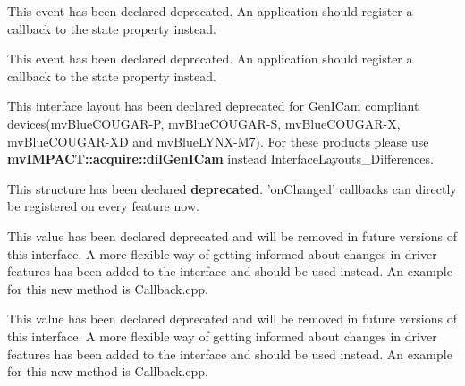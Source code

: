 
\begin{DoxyRefList}
\item[\label{deprecated__deprecated000002}%
\hypertarget{deprecated__deprecated000002}{}%
成员 \hyperlink{group___common_interface_gga0947eb7d6a73b9baab283cbf65cd8d6bae72bb800d1cb1bdc884bb666324a410a}{det\+Pn\+P\+Arrival} ]This event has been declared deprecated. An application should register a callback to the state property instead.  
\item[\label{deprecated__deprecated000003}%
\hypertarget{deprecated__deprecated000003}{}%
成员 \hyperlink{group___common_interface_gga0947eb7d6a73b9baab283cbf65cd8d6bac951ab7abab67fbaa3249ad87084efaf}{det\+Pn\+P\+Removal} ]This event has been declared deprecated. An application should register a callback to the state property instead.  
\item[\label{deprecated__deprecated000004}%
\hypertarget{deprecated__deprecated000004}{}%
成员 \hyperlink{group___common_interface_gga8206c9f9a594b7c21b43aaa624a86220a1c2d04e0af3f97abd39f3e0dbc0a567d}{dil\+Device\+Specific} ]This interface layout has been declared deprecated for Gen\+I\+Cam compliant devices(mv\+Blue\+C\+O\+U\+G\+A\+R-\/\+P, mv\+Blue\+C\+O\+U\+G\+A\+R-\/\+S, mv\+Blue\+C\+O\+U\+G\+A\+R-\/\+X, mv\+Blue\+C\+O\+U\+G\+A\+R-\/\+X\+D and mv\+Blue\+L\+Y\+N\+X-\/\+M7). For these products please use {\bfseries mv\+I\+M\+P\+A\+C\+T\+::acquire\+::dil\+Gen\+I\+Cam} instead Interface\+Layouts\+\_\+\+Differences.  
\item[\label{deprecated__deprecated000005}%
\hypertarget{deprecated__deprecated000005}{}%
类 \hyperlink{struct_event_data}{Event\+Data} ]This structure has been declared {\bfseries deprecated}. 'on\+Changed' callbacks can directly be registered on every feature now.  
\item[\label{deprecated__deprecated000017}%
\hypertarget{deprecated__deprecated000017}{}%
成员 \hyperlink{group___common_interface_gga0dca79bbf0803a4ecec16d6cbb1a3dbba854e3709b91d7b837e17de91404c5a1a}{mv\+I\+M\+P\+A\+C\+T\+:\+:acquire\+:\+:dlt\+Event\+Sub\+System\+Results} ]This value has been declared deprecated and will be removed in future versions of this interface. A more flexible way of getting informed about changes in driver features has been added to the interface and should be used instead. An example for this new method is Callback.\+cpp.  
\item[\label{deprecated__deprecated000016}%
\hypertarget{deprecated__deprecated000016}{}%
成员 \hyperlink{group___common_interface_gga0dca79bbf0803a4ecec16d6cbb1a3dbbadfcd0c73c98d71804d38235e8139dad8}{mv\+I\+M\+P\+A\+C\+T\+:\+:acquire\+:\+:dlt\+Event\+Sub\+System\+Settings} ]This value has been declared deprecated and will be removed in future versions of this interface. A more flexible way of getting informed about changes in driver features has been added to the interface and should be used instead. An example for this new method is Callback.\+cpp.  

\end{DoxyRefList}
